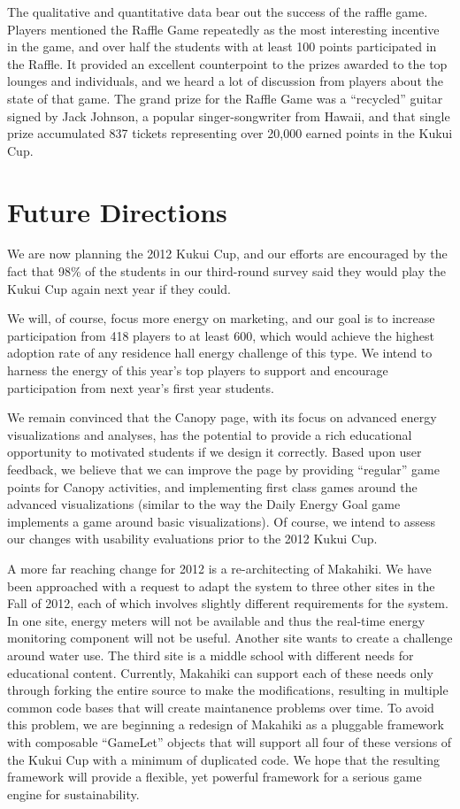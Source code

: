 \documentclass{acm_proc_article-sp}
\begin{document}
The qualitative and quantitative data bear out the success of the raffle game.  Players mentioned the Raffle Game repeatedly as the most interesting incentive in the game, and over half the students with at least 100 points participated in the Raffle.   It provided an excellent counterpoint to the prizes awarded to the top lounges and individuals, and we heard a lot of discussion from players about the state of that game.   The grand prize for the Raffle Game was a ``recycled'' guitar signed by Jack Johnson, a popular singer-songwriter from Hawaii, and that single prize accumulated 837 tickets representing over 20,000 earned points in the Kukui Cup.


\section{Future Directions}

We are now planning the 2012 Kukui Cup, and our efforts are encouraged
by the fact that 98\% of the students in our third-round survey said they
would play the Kukui Cup again next year if they could.

We will, of course, focus more energy on marketing, and our goal is to
increase participation from 418 players to at least 600, which would
achieve the highest adoption rate of any residence hall energy challenge of this
type.  We intend to harness the energy of this year's top players to
support and encourage participation from next year's first year students.

We remain convinced that the Canopy page, with its focus on advanced energy
visualizations and analyses, has the potential to provide a rich
educational opportunity to motivated students if we design it
correctly.  Based upon user feedback, we believe that we can improve the
page by providing ``regular'' game points for Canopy activities, and
implementing first class games around the advanced visualizations (similar
to the way the Daily Energy Goal game implements a game around basic
visualizations).  Of course, we intend to assess our changes with usability
evaluations prior to the 2012 Kukui Cup.

A more far reaching change for 2012 is a re-architecting of Makahiki.  We
have been approached with a request to adapt the system to three other
sites in the Fall of 2012, each of which involves slightly different
requirements for the system. In one site, energy meters will not be
available and thus the real-time energy monitoring component will not be
useful. Another site wants to create a challenge around water use.  The
third site is a middle school with different needs for educational content.
Currently, Makahiki can support each of these needs only through forking
the entire source to make the modifications, resulting in multiple common
code bases that will create maintanence problems over time.  To avoid this
problem, we are beginning a redesign of Makahiki as a pluggable framework
with composable ``GameLet'' objects that will support all four of these versions of
the Kukui Cup with a minimum of duplicated code.  We hope that the
resulting framework will provide a flexible, yet powerful framework for a
serious game engine for sustainability.
\end{document}
